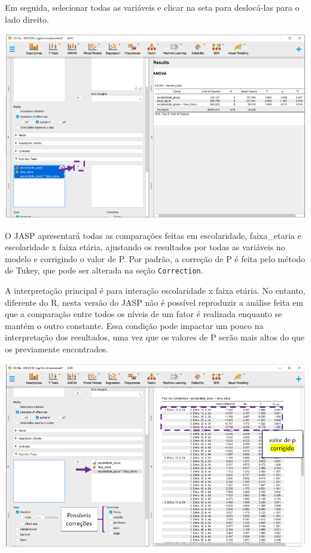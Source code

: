 \documentclass[
]{book}
\begin{document}
Em seguida, selecionar todas as variáveis e clicar na seta para deslocá-las para o lado direito.

\includegraphics{./img/cap_anova_fatorial_posthoc2.png}

O JASP apresentará todas as comparações feitas em escolaridade, faixa\_etaria e escolaridade x faixa etária, ajustando os resultados por todas as variáveis no modelo e corrigindo o valor de P. Por padrão, a correção de P é feita pelo método de Tukey, que pode ser alterada na seção \texttt{Correction}.

A interpretação principal é para interação escolaridade x faixa etária. No entanto, diferente do R, nesta versão do JASP não é possível reproduzir a análise feita em que a comparação entre todos os níveis de um fator é realizada enquanto se mantém o outro constante. Essa condição pode impactar um pouco na interpretação dos resultados, uma vez que os valores de P serão mais altos do que os previamente encontrados.

\includegraphics{./img/cap_anova_fatorial_posthoc3.png}
\end{document}
